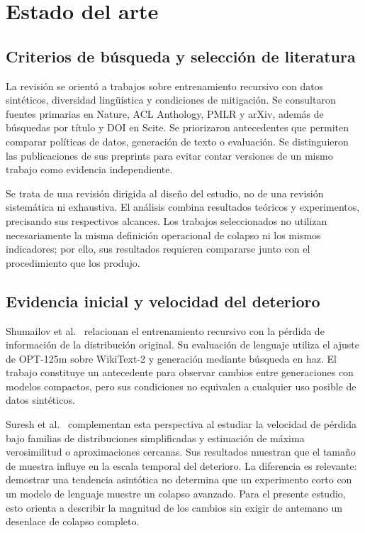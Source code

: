 \documentclass[12pt,letterpaper]{article}
\begin{document}
\section{Estado del arte}

\subsection{Criterios de búsqueda y selección de literatura}

La revisión se orientó a trabajos sobre entrenamiento recursivo con datos
sintéticos, diversidad lingüística y condiciones de mitigación. Se
consultaron fuentes primarias en Nature, ACL Anthology, PMLR y arXiv,
además de búsquedas por título y DOI en Scite. Se priorizaron antecedentes
que permiten comparar políticas de datos, generación de texto o evaluación.
Se distinguieron las publicaciones de sus preprints para evitar contar
versiones de un mismo trabajo como evidencia independiente.

Se trata de una revisión dirigida al diseño del estudio, no de una revisión
sistemática ni exhaustiva. El análisis combina resultados teóricos y
experimentos, precisando sus respectivos alcances. Los trabajos
seleccionados no utilizan necesariamente la misma definición operacional
de colapso ni los mismos indicadores; por ello, sus resultados requieren
compararse junto con el procedimiento que los produjo.

\subsection{Evidencia inicial y velocidad del deterioro}

Shumailov et al.\ \cite{shumailov2024} relacionan el entrenamiento recursivo
con la pérdida de información de la distribución original. Su evaluación
de lenguaje utiliza el ajuste de OPT-125m sobre WikiText-2 y generación
mediante búsqueda en haz. El trabajo constituye un antecedente para
observar cambios entre generaciones con modelos compactos, pero sus
condiciones no equivalen a cualquier uso posible de datos sintéticos.

Suresh et al.\ \cite{suresh2025} complementan esta perspectiva al estudiar
la velocidad de pérdida bajo familias de distribuciones simplificadas y
estimación de máxima verosimilitud o aproximaciones cercanas. Sus
resultados muestran que el tamaño de muestra influye en la escala temporal
del deterioro. La diferencia es relevante: demostrar una tendencia
asintótica no determina que un experimento corto con un modelo de lenguaje
muestre un colapso avanzado. Para el presente estudio, esto orienta a
describir la magnitud de los cambios sin exigir de antemano un desenlace
de colapso completo.
\end{document}
